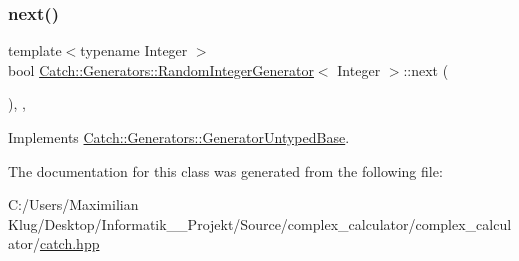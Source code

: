 \mbox{\label{class_catch_1_1_generators_1_1_random_integer_generator_aaa3db70fbdfa3e8dcb61fb5592eba81f}} 
\subsubsection{\texorpdfstring{next()}{next()}}
{\footnotesize\ttfamily template$<$typename Integer $>$ \\
bool \mbox{\hyperlink{class_catch_1_1_generators_1_1_random_integer_generator}{Catch\+::\+Generators\+::\+Random\+Integer\+Generator}}$<$ Integer $>$\+::next (\begin{DoxyParamCaption}{ }\end{DoxyParamCaption})\hspace{0.3cm}{\ttfamily [inline]}, {\ttfamily [override]}, {\ttfamily [virtual]}}



Implements \mbox{\hyperlink{class_catch_1_1_generators_1_1_generator_untyped_base_aeed3c0cd6233c5f553549e453b8d6638}{Catch\+::\+Generators\+::\+Generator\+Untyped\+Base}}.



The documentation for this class was generated from the following file\+:\begin{DoxyCompactItemize}
\item 
C\+:/\+Users/\+Maximilian Klug/\+Desktop/\+Informatik\+\_\+\_\+\+Projekt/\+Source/complex\+\_\+calculator/complex\+\_\+calculator/\mbox{\hyperlink{catch_8hpp}{catch.\+hpp}}\end{DoxyCompactItemize}
